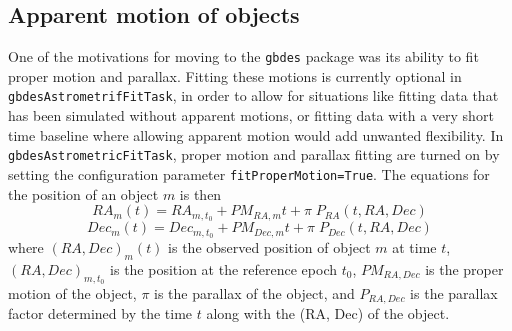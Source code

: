 \documentclass[DM,authoryear,toc]{lsstdoc}
\begin{document}
\subsection{Apparent motion of objects}\label{sec:Motion}
One of the motivations for moving to the \texttt{gbdes} package was its ability to fit proper motion and parallax. Fitting these motions is currently optional in \texttt{gbdesAstrometrifFitTask}, in order to allow for situations like fitting data that has been simulated without apparent motions, or fitting data with a very short time baseline where allowing apparent motion would add unwanted flexibility. In \texttt{gbdesAstrometricFitTask}, proper motion and parallax fitting are turned on by setting the configuration parameter \texttt{fitProperMotion=True}.
The equations for the position of an object $m$ is then
\begin{equation}
RA_m(t) = RA_{m, t_0} + PM_{RA, m}t + \pi \;P_{RA}(t, RA, Dec)
\end{equation}
\begin{equation}
Dec_m(t) = Dec_{m, t_0} + PM_{Dec, m}t + \pi \;P_{Dec}(t, RA, Dec)
\end{equation}
where $(RA, Dec)_m(t)$ is the observed position of object $m$ at time $t$, $(RA, Dec)_{m, t_{0}}$ is the position at the reference epoch $t_0$, $PM_{RA,Dec} $ is the proper motion of the object, $\pi$ is the parallax of the object, and $P_{RA, Dec}$ is the parallax factor determined by the time $t$ along with the (RA, Dec) of the object.
\end{document}
